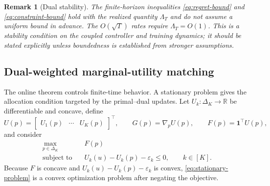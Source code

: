 \documentclass[11pt]{article}
\newtheorem{remark}{Remark}
\newcommand{\R}{\mathbb{R}}
\newcommand{\DeltaK}{\Delta_K}
\newcommand{\one}{\mathbf{1}}
\begin{document}
\begin{remark}[Dual stability]
The finite-horizon inequalities \eqref{eq:regret-bound} and \eqref{eq:constraint-bound} hold with the realized quantity $\Lambda_T$ and do not assume a uniform bound in advance. The $O(\sqrt T)$ rates require $\Lambda_T=O(1)$. This is a stability condition on the coupled controller and training dynamics; it should be stated explicitly unless boundedness is established from stronger assumptions.
\end{remark}

\subsection{Dual-weighted marginal-utility matching}

The online theorem controls finite-time behavior. A stationary problem gives the allocation condition targeted by the primal--dual updates. Let $U_k:\DeltaK\to\R$ be differentiable and concave, define
\[
    U(p)=\begin{bmatrix}U_1(p)&\cdots&U_K(p)\end{bmatrix}^{\!\top},
    \qquad
    G(p)=\nabla_pU(p),
    \qquad
    F(p)=\one^\top U(p),
\]
and consider
\begin{equation}
\begin{aligned}
    \max_{p\in\DeltaK}\quad
    &F(p)\\
    \text{subject to}\quad
    &U_k(u)-U_k(p)-\varepsilon_k\le0,
    \qquad k\in[K].
\end{aligned}
\label{eq:stationary-problem}
\end{equation}
Because $F$ is concave and $U_k(u)-U_k(p)-\varepsilon_k$ is convex, \eqref{eq:stationary-problem} is a convex optimization problem after negating the objective.
\end{document}
